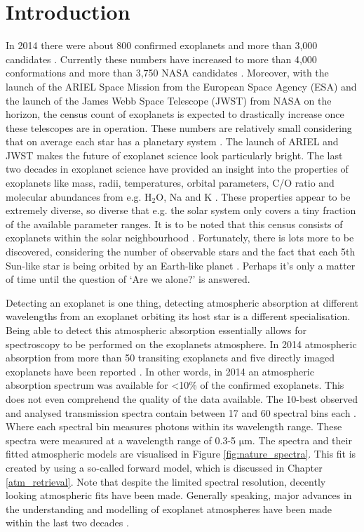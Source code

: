 \chapter{Introduction}
In 2014 there were about 800 confirmed exoplanets and more than 3,000 candidates \cite{madhusudhan2014exoplanetary}. Currently these numbers have increased to more than 4,000 conformations and more than 3,750 NASA candidates \cite{nasa_2015}.  Moreover, with the launch of the ARIEL Space Mission from the European Space Agency (ESA) and the launch of the James Webb Space Telescope (JWST) from NASA on the horizon, the census count of exoplanets is expected to drastically increase once these telescopes are in operation. These numbers are relatively small considering that on average each star has a planetary system \cite{krijt2015grains}. The launch of ARIEL and JWST makes the future of exoplanet science look particularly bright. The last two decades in exoplanet science have provided an insight into the properties of exoplanets like mass, radii, temperatures, orbital parameters, C/O ratio and molecular abundances from e.g. $\mathrm{H_2O}$, Na and K \cite{madhusudhan2014exoplanetary, sing2016continuum}. These properties appear to be extremely diverse, so diverse that e.g. the solar system only covers a tiny fraction of the available parameter ranges. It is to be noted that this census consists of exoplanets within the solar neighbourhood \cite{madhusudhan2014exoplanetary}. Fortunately, there is lots more to be discovered, considering the number of observable stars and the fact that each 5th Sun-like star is being orbited by an Earth-like planet \cite{krijt2015grains}. Perhaps it’s only a matter of time until the question of ‘Are we alone?’ is answered. 

Detecting an exoplanet is one thing, detecting atmospheric absorption at different wavelengths from an exoplanet orbiting its host star is a different specialisation. Being able to detect this atmospheric absorption essentially allows for spectroscopy to be performed on the exoplanets atmosphere. In 2014 atmospheric absorption from more than 50 transiting exoplanets and five directly imaged exoplanets have been reported \cite{madhusudhan2014exoplanetary}. In other words, in 2014 an atmospheric absorption spectrum was available for <10\% of the confirmed exoplanets. This does not even comprehend the quality of the data available. The 10-best observed and analysed transmission spectra contain between 17 and 60 spectral bins each \cite{sing2016continuum}. Where each spectral bin measures photons within its wavelength range. These spectra were measured at a wavelength range of 0.3-5 $\mathrm{\mu}$m. The spectra and their fitted atmospheric models are visualised in Figure \ref{fig:nature_spectra}. This fit is created by using a so-called forward model, which is discussed in Chapter \ref{atm_retrieval}. Note that despite the limited spectral resolution, decently looking atmospheric fits have been made. Generally speaking, major advances in the understanding and modelling of exoplanet atmospheres have been made within the last two decades \cite{madhusudhan2014exoplanetary}. 

